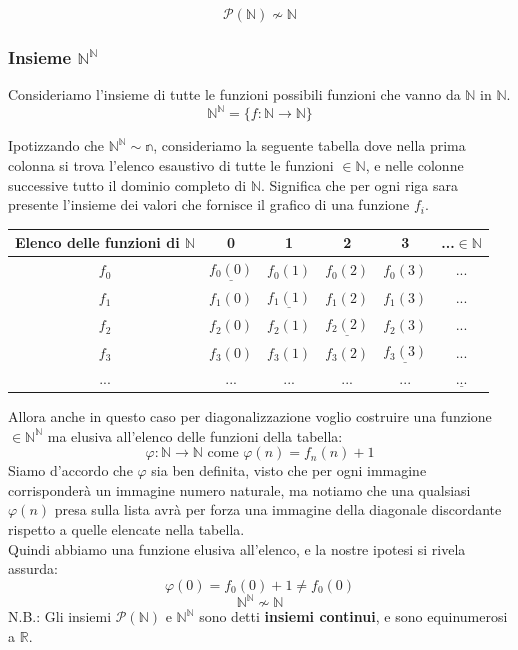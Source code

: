 \documentclass{article}
\begin{document}
$$\mathcal{P}(\mathbb{N})\nsim\mathbb{N}$$

\subsubsection{Insieme $\mathbb{N}^{\mathbb{N}}$}
Consideriamo l'insieme di tutte le funzioni possibili funzioni che vanno da $\mathbb{N}$ in $\mathbb{N}$.
$$\mathbb{N}^{\mathbb{N}}=\{f:\mathbb{N}\rightarrow\mathbb{N}\}$$

Ipotizzando che $\mathbb{N}^{\mathbb{N}}\sim\mathbb{n}$, consideriamo la seguente tabella dove nella prima
colonna si trova l'elenco esaustivo di tutte le funzioni $\in\mathbb{N}$, e nelle colonne successive tutto
il dominio completo di $\mathbb{N}$. Significa che per ogni riga sara presente l'insieme dei valori che
fornisce il grafico di una funzione $f_i$.
\begin{center}
    \begin{tabular}{c|ccccc}
        \toprule
        Elenco delle funzioni di $\mathbb{N}$ & \textbf{0}           & \textbf{1}           & \textbf{2}           & \textbf{3}            & \textbf{...$\in\mathbb{N}$} \\
        \midrule
        $f_0$                                 & $\underline{f_0(0)}$ & $f_0(1)$             & $f_0(2)$             & $f_0(3)$              & $...$                       \\
        $f_1$                                 & $f_1(0)$             & $\underline{f_1(1)}$ & $f_1(2)$             & $f_1(3)$              & $...$                       \\
        $f_2$                                 & $f_2(0)$             & $f_2(1)$             & $\underline{f_2(2)}$ & $f_2(3)$              & $...$                       \\
        $f_3$                                 & $f_3(0)$             & $f_3(1)$             & $f_3(2)$             & $\underline{f_ 3(3)}$ & $...$                       \\
        $...$                                 & $...$                & $...$                & $...$                & $...$                 & $\underline{...}$           \\
        \bottomrule
    \end{tabular}
\end{center}
Allora anche in questo caso per diagonalizzazione voglio costruire una funzione $\in\mathbb{N}^{\mathbb{N}}$ ma
elusiva all'elenco delle funzioni della tabella:
$$\varphi:\mathbb{N}\rightarrow\mathbb{N}\text{ come }\varphi(n)=f_n(n)+1$$
Siamo d'accordo che $\varphi$ sia ben definita, visto che per ogni immagine corrisponderà un immagine numero naturale,
ma notiamo che una qualsiasi $\varphi(n)$ presa sulla lista avrà per forza una immagine della diagonale discordante
rispetto a quelle elencate nella tabella.\\ Quindi abbiamo una funzione elusiva all'elenco, e la nostre ipotesi si rivela assurda:
$$\varphi(0)=f_0(0)+1\neq f_0(0)$$
$$\mathbb{N}^{\mathbb{N}}\nsim\mathbb{N}$$
N.B.: Gli insiemi $\mathcal{P}(\mathbb{N})$ e $\mathbb{N}^{\mathbb{N}}$ sono detti \textbf{insiemi continui},
e sono equinumerosi a $\mathbb{R}$.
\end{document}
